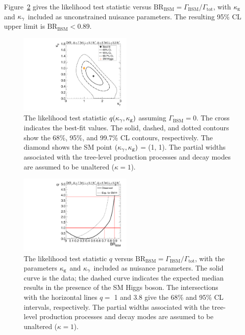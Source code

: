 \documentclass[12pt,twoside,a4paper,cmspaper,final,collab]{cms-tdr}
\begin{document}
Figure~\ref{fig:BSM2} gives the likelihood test statistic versus
$\mathrm{BR}_{\mathrm{BSM}}=\Gamma_{\mathrm{BSM}}/\Gamma_{\text{tot}}$,
with $\kappa_{\mathrm{g}}$ and $\kappa_{\gamma}$ included as unconstrained nuisance parameters.
The resulting 95\% CL upper limit is  $\mathrm{BR}_{\mathrm{BSM}} < 0.89$.


\begin{figure}[bhtp]
\centering
\includegraphics[width=0.49\textwidth]{figures/comb/sqr_kgkglu_scan_2d_comb_HPA}
\caption{
The likelihood test statistic  $q(\kappa_{\gamma}, \kappa_{\mathrm{g}})$ assuming $\Gamma_{\mathrm{BSM}}=0$.
        The cross indicates the best-fit values. The solid, dashed, and dotted contours show the
        68\%, 95\%,  and 99.7\% CL contours, respectively. The diamond shows the SM point
        $(\kappa_{\gamma}, \kappa_{\mathrm{g}})$ = (1, 1).
The partial widths associated with the tree-level production processes
and decay modes are assumed to be unaltered ($\kappa = 1$).
}
\label{fig:BSM1}
\end{figure}

\begin{figure}[bhtp]
\centering
\includegraphics[width=0.49\textwidth]{figures/comb/sqr_brinv_scan_1d_all}
\caption{
The likelihood test statistic $q$ versus $\mathrm{BR}_{\mathrm{BSM}}=\Gamma_{\mathrm{BSM}}/\Gamma_{\mathrm{tot}}$,
        with the parameters $\kappa_{\mathrm{g}}$ and $\kappa_{\gamma}$ included as  nuisance parameters.
        The solid curve is the data; the dashed curve indicates the expected median results in the presence of the SM Higgs boson.
The intersections with the horizontal lines $q=$ 1 and 3.8 give the 68\% and 95\% CL intervals, respectively.
The partial widths associated with the tree-level production processes
and decay modes are assumed to be unaltered ($\kappa = 1$).
}
\label{fig:BSM2}
\end{figure}
\end{document}
